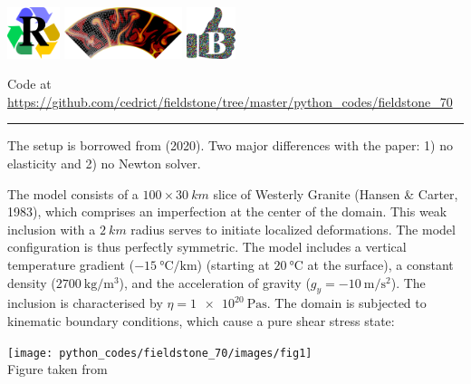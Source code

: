 \includegraphics[height=1.5cm]{images/pictograms/replication}
\includegraphics[height=1.5cm]{images/pictograms/aspect_logo}
\includegraphics[height=1.5cm]{images/pictograms/benchmark}



\begin{center}
Code at \url{https://github.com/cedrict/fieldstone/tree/master/python_codes/fieldstone_70}
\end{center}

\par\noindent\rule{\textwidth}{0.4pt}


The setup is borrowed from \textcite{dudy20} (2020). 
Two major differences with the paper: 1) no elasticity and 2) no Newton solver.

The model consists of a $100\times 30~\si{km}$ slice of Westerly Granite (Hansen \& Carter, 1983), 
which comprises an imperfection at the center of the domain.
This weak inclusion with a $\SI{2}{km}$ radius serves to initiate
localized deformations. The model configuration is thus perfectly symmetric. 
The model includes a vertical temperature gradient ($-15~\si{\celsius\per\km}$) (starting 
at $20~\si{\celsius}$ at the surface), a constant density ($\SI{2700}{\kg\per\cubic\metre}$), 
and the acceleration of gravity ($g_y=-\SI{10}{\metre\per\second\squared}$).
The inclusion is characterised by $\eta=\SI{1e20}{\pascal\second}$.
The domain is subjected to kinematic boundary conditions, which cause a pure shear stress state:

\begin{center}
\texttt{[image: python\_codes/fieldstone\_70/images/fig1]}\\
{\captionfont Figure taken from \cite{dudy20}}
\end{center}

